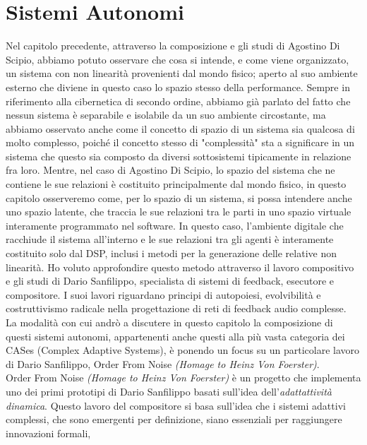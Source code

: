\section{Sistemi Autonomi}
\label{sec:Sistemi Autonomi}

Nel capitolo precedente, attraverso la composizione e gli studi di Agostino Di Scipio, 
abbiamo potuto osservare che cosa si intende, e come viene organizzato, 
un sistema con non linearità provenienti dal mondo fisico; aperto al suo ambiente esterno 
che diviene in questo caso lo spazio stesso della performance.
Sempre in riferimento alla cibernetica di secondo ordine,
abbiamo già parlato del fatto che nessun sistema è separabile e 
isolabile da un suo ambiente circostante, 
ma abbiamo osservato anche come il concetto di spazio di un sistema sia 
qualcosa di molto complesso, poiché il concetto stesso di "complessità"
sta a significare in un sistema che questo sia composto da diversi sottosistemi tipicamente in relazione fra loro.
Mentre, nel caso di Agostino Di Scipio, lo spazio del sistema che ne contiene le sue relazioni 
è costituito principalmente dal mondo fisico, 
in questo capitolo osserveremo come, per lo spazio di un sistema, 
si possa intendere anche uno spazio latente, 
che traccia le sue relazioni tra le parti in uno spazio virtuale interamente programmato nel software. 
In questo caso, l'ambiente digitale che racchiude il sistema all'interno e le sue relazioni 
tra gli agenti è interamente costituito solo dal DSP, 
inclusi i metodi per la generazione delle relative non linearità.
Ho voluto approfondire questo metodo attraverso il lavoro compositivo e gli studi di Dario Sanfilippo, 
specialista di sistemi di feedback, esecutore e compositore. 
I suoi lavori riguardano principi di autopoiesi, evolvibilità e costruttivismo radicale nella progettazione 
di reti di feedback audio complesse. \\
La modalità con cui andrò a discutere in questo capitolo la composizione di questi
sistemi autonomi, appartenenti anche questi alla più vasta categoria dei CASes (Complex Adaptive Systems), 
è ponendo un focus su un particolare lavoro di Dario Sanfilippo, Order From Noise \textit{(Homage to Heinz Von Foerster)}. \\
Order From Noise \textit{(Homage to Heinz Von Foerster)} è un progetto che implementa uno 
dei primi prototipi di Dario Sanfilippo basati sull'idea dell'\textit{adattattività dinamica}. 
Questo lavoro del compositore si basa sull'idea che i sistemi adattivi complessi, 
che sono emergenti per definizione, siano essenziali per raggiungere innovazioni formali, 
